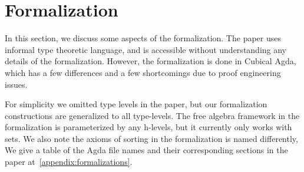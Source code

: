 
\section{Formalization}
\label{sec:formalization}

In this section, we discuss some aspects of the formalization.
The paper uses informal type theoretic language,
and is accessible without understanding any details of the formalization.
However, the formalization is done in Cubical Agda, which has a few differences and a few
shortcomings due to proof engineering issues.

For simplicity we omitted type levels in the paper, but our formalization constructions
are generalized to all type-levels.
The free algebra framework in the formalization is
parameterized by any h-levels, but it currently only works with sets.
We also note the axioms of sorting in the formalization is named differently,
We give a table of the Agda file names and their corresponding sections in the paper
at~\cref{appendix:formalizations}.

